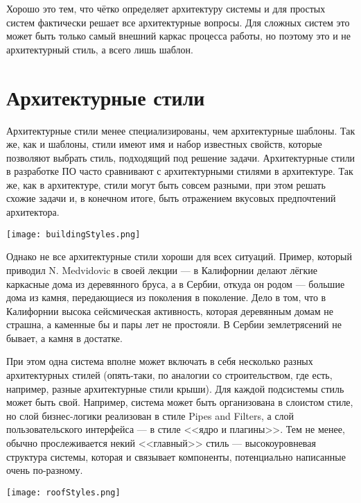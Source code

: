 \documentclass{../../text-style}
\begin{document}
Хорошо это тем, что чётко определяет архитектуру системы и для простых систем фактически решает все архитектурные вопросы. Для сложных систем это может быть только самый внешний каркас процесса работы, но поэтому это и не архитектурный стиль, а всего лишь шаблон.

\section{Архитектурные стили}

\noindent\begin{minipage}{\textwidth}
    \begin{minipage}[c][6cm][c]{\dimexpr0.5\textwidth-0.5\Colsep\relax}
        Архитектурные стили менее специализированы, чем архитектурные шаблоны. Так же, как и шаблоны, стили имеют имя и набор известных свойств, которые позволяют выбрать стиль, подходящий под решение задачи. Архитектурные стили в разработке ПО часто сравнивают с архитектурными стилями в архитектуре. Так же, как в архитектуре, стили могут быть совсем разными, при этом решать схожие задачи и, в конечном итоге, быть отражением вкусовых предпочтений архитектора.
    \end{minipage}\hfill
    \begin{minipage}[c][6cm][c]{\dimexpr0.5\textwidth-0.5\Colsep\relax}
        \texttt{[image: buildingStyles.png]}
    \end{minipage}%
\end{minipage}

Однако не все архитектурные стили хороши для всех ситуаций. Пример, который приводил N. Medvidovic в своей лекции --- в Калифорнии делают лёгкие каркасные дома из деревянного бруса, а в Сербии, откуда он родом --- большие дома из камня, передающиеся из поколения в поколение. Дело в том, что в Калифорнии высока сейсмическая активность, которая деревянным домам не страшна, а каменные бы и пары лет не простояли. В Сербии землетрясений не бывает, а камня в достатке.

\noindent\begin{minipage}{\textwidth}
    \begin{minipage}[c][6cm][c]{\dimexpr0.6\textwidth-0.5\Colsep\relax}
        При этом одна система вполне может включать в себя несколько разных архитектурных стилей (опять-таки, по аналогии со строительством, где есть, например, разные архитектурные стили крыши). Для каждой подсистемы стиль может быть свой. Например, система может быть организована в слоистом стиле, но слой бизнес-логики реализован в стиле Pipes and Filters, а слой пользовательского интерфейса --- в стиле <<ядро и плагины>>. Тем не менее, обычно прослеживается некий <<главный>> стиль --- высокоуровневая структура системы, которая и связывает компоненты, потенциально написанные очень по-разному.
    \end{minipage}\hfill
    \begin{minipage}[c][6cm][c]{\dimexpr0.4\textwidth-0.5\Colsep\relax}
        \texttt{[image: roofStyles.png]}
    \end{minipage}%
\end{minipage}
\end{document}
